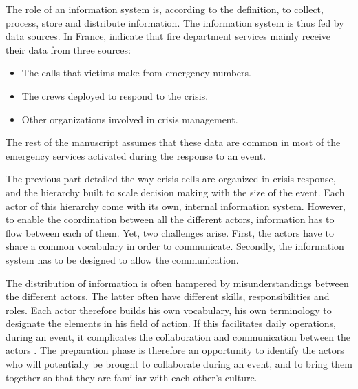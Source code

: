 The role of an information system is, according to the definition, to collect, process, store and distribute information.
The information system is thus fed by data sources.
In France, \cite{morelEtudePriseDecision2010} indicate that fire department services mainly receive their data from three sources:
\begin{itemize}
    \item The calls that victims make from emergency numbers.
    \item The crews deployed to respond to the crisis.
    \item Other organizations involved in crisis management.
\end{itemize}
The rest of the manuscript assumes that these data are common in most of the emergency services activated during the response to an event.

The previous part detailed the way crisis cells are organized in crisis response, and the hierarchy built to scale decision making with the size of the event.
Each actor of this hierarchy come with its own, internal information system.
However, to enable the coordination between all the different actors, information has to flow between each of them.
Yet, two challenges arise.
First, the actors have to share a common vocabulary in order to communicate.
Secondly, the information system has to be designed to allow the communication.

The distribution of information is often hampered by misunderstandings between the different actors.
The latter often have different skills, responsibilities and roles.
Each actor therefore builds his own vocabulary, his own terminology to designate the elements in his field of action.
If this facilitates daily operations, during an event, it complicates the collaboration and communication between the actors \cite{opachMapbasedInterfacesCommon2020}.
The preparation phase is therefore an opportunity to identify the actors who will potentially be brought to collaborate during an event, and to bring them together so that they are familiar with each other's culture.

